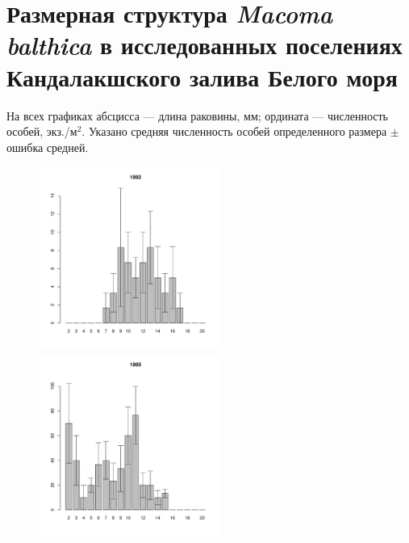 \section{Размерная структура {\it Macoma balthica} в исследованных поселениях Кандалакшского залива Белого моря}
\label{app:White_sizestr_hist}

На всех графиках абсцисса --- длина раковины, мм; ордината --- численность особей, экз./м$^2$. Указано средняя численность особей определенного размера $\pm$ ошибка средней.

	\begin{figure}[hp]

	\begin{minipage}[b]{.3\linewidth}
	\begin{center}
	\includegraphics[width=60mm]{../White_Sea/Estuatiy_Luvenga/sizestr2_1992_.pdf}	
	\end{center}
	\end{minipage}
	\hfil %
	\begin{minipage}[b]{.3\linewidth}
	\begin{center}
	\includegraphics[width=60mm]{../White_Sea/Estuatiy_Luvenga/sizestr2_1995_.pdf}
	\end{center}
	\end{minipage}
	\hfil %

\end{figure}
